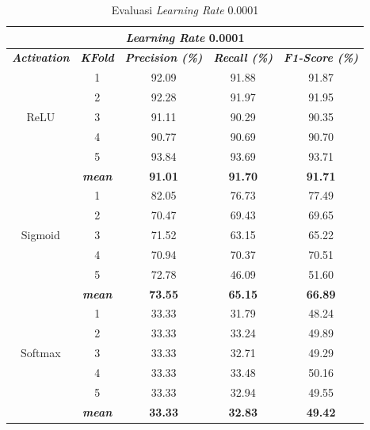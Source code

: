     \begin{table}[H]
        \centering
        \caption{Evaluasi \textit{Learning Rate} 0.0001 }
        \begin{tabular}{ccccc}
            \toprule
            \multicolumn{5}{c}{\textit{Learning Rate} 0.0001} \\ \hline
            
            \textbf{\textit{Activation}} & \multicolumn{1}{c}{\textbf{\textit{KFold}}} & \textbf{\textit{Precision (\%)} } & \textbf{\textit{Recall (\%)}} & \textbf{\textit{F1-Score (\%)}}  \\
    
            \midrule
            \multirow{5}{*}{ReLU} 
            
            & 1 & 92.09 & 91.88 & 91.87 \\
            & 2 & 92.28 & 91.97 & 91.95 \\
            & 3 & 91.11 & 90.29 & 90.35 \\
            & 4 & 90.77 & 90.69 & 90.70 \\
            & 5 & 93.84 & 93.69 & 93.71 \\ 
            & \textit{\textbf{mean}}& \textbf{91.01} & \textbf{91.70} &\textbf{91.71} \\ 
            \hline


            
            \multirow{5}{*}{Sigmoid}
            & 1 &  82.05 & 76.73 & 77.49  \\
            & 2 &  70.47 & 69.43 & 69.65 \\
            & 3 &  71.52 & 63.15 & 65.22  \\
            & 4 &  70.94 & 70.37 & 70.51 \\
            & 5 &  72.78 & 46.09 & 51.60 \\
            & \textit{\textbf{mean}}& \textbf{73.55} & \textbf{65.15} &\textbf{66.89} \\ 
                        \hline
    
            \multirow{5}{*}{Softmax}
            & 1 & 33.33  & 31.79 & 48.24 \\
            & 2 & 33.33  & 33.24 & 49.89 \\
            & 3 & 33.33  & 32.71 & 49.29 \\
            & 4 & 33.33  & 33.48 & 50.16 \\
            & 5 & 33.33  & 32.94 & 49.55 \\
            & \textit{\textbf{mean}}& \textbf{33.33} & \textbf{32.83} &\textbf{49.42} \\ 
    

            \bottomrule
        \end{tabular}
        \label{Evaluasi Learning Rate 0.0001 }
    \end{table}

